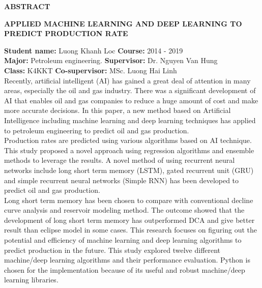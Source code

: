 \documentclass[12pt,a4paper]{report}
\begin{document}
\newpage
\begin{center}
	\centering
	\textbf{ABSTRACT}
\end{center}

\begin{center}
	\centering
	\textbf{APPLIED MACHINE LEARNING AND DEEP LEARNING TO PREDICT PRODUCTION RATE}
\end{center}
\textbf{Student name:} Luong Khanh Loc \hspace*{2.4cm}\textbf{Course:} 2014 - 2019\\
\textbf{Major:} Petroleum engineering. \hspace*{3cm}\textbf{Supervisor:} Dr. Nguyen Van Hung\\
\textbf{Class:}  K4KKT \hspace*{5.8cm} \textbf{Co-supervisor:} MSc. Luong Hai Linh\\

Recently, artificial intelligent (AI) has gained a great deal of attention in many areas, especially the oil and gas industry. There was a significant development of AI that enables oil and gas companies to reduce a huge amount of cost and make more accurate decisions. In this paper, a new method based on Artificial Intelligence including machine learning and deep learning techniques has applied to petroleum engineering to predict oil and gas production.\\
Production rates are predicted using various algorithms based on AI technique. This study proposed a novel approach using regression algorithms and ensemble methods to leverage the results. A novel method of using recurrent neural networks include long short term memory (LSTM), gated recurrent unit (GRU) and simple recurrent neural networks (Simple RNN) has been developed to predict oil and gas production. \\
Long short term memory has been chosen to compare with conventional decline curve analysis and reservoir modeling method. The outcome showed that the development of long short term memory has outperformed DCA and give better result than eclipse model in some cases.
This research focuses on figuring out the potential and efficiency of machine learning and deep learning algorithms to predict production in the future. This study explored twelve different machine/deep learning algorithms and their performance evaluation. Python is chosen for the implementation because of its useful and robust machine/deep learning libraries.
\end{document}
